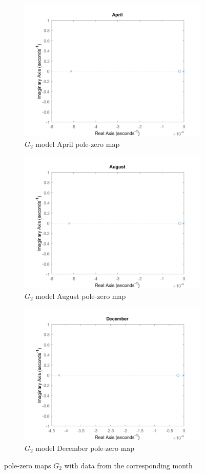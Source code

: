 \documentclass[a4paper,12pt]{report}
\numberwithin{equation}{section}
\begin{document}
\begin{figure}[H] \ContinuedFloat
\begin{subfigure}{\textwidth}
  \centering
  \includegraphics[width=.55\linewidth]{G2_apr_pzmap.png}
  \caption{$G_{2}$ model April pole-zero map}
  \label{fig:G2_apr_pzmap}
\end{subfigure}
\begin{subfigure}{\textwidth}
  \centering
  \includegraphics[width=.55\linewidth]{G2_aug_pzmap.png}
  \caption{$G_{2}$ model August pole-zero map}
  \label{fig:G2_aug_pzmap}
\end{subfigure}
\begin{subfigure}{\textwidth}
  \centering
  \includegraphics[width=.55\linewidth]{G2_dec_pzmap.png}
  \caption{$G_{2}$ model December pole-zero map}
  \label{fig:G2_dec_pzmap}
\end{subfigure}
\caption{pole-zero maps $G_{2}$ with data from the corresponding month}
\label{fig:pzmapmanymonths}
\end{figure}
\end{document}
